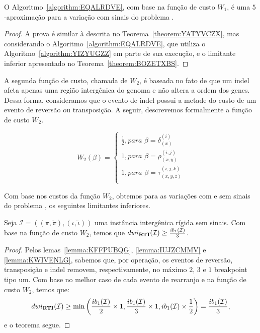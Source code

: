 \begin{theorem}\label{theorem:XMRIBCHD}
O Algoritmo~\ref{algorithm:EQALRDVE}, com base na função de custo $W_1$, é uma $5$-aproximação para a variação com sinais do problema \SbWIRI{}.
\end{theorem}
\begin{proof}
A prova é similar à descrita no Teorema~\ref{theorem:YATYVCZX}, mas considerando o Algoritmo~\ref{algorithm:EQALRDVE}, que utiliza o Algoritmo~\ref{algorithm:YIZYUGZZ} em parte de sua execução, e o limitante inferior apresentado no Teorema~\ref{theorem:BOZETXBS}.
\end{proof}

A segunda função de custo, chamada de $W_2$, é baseada no fato de que um indel afeta apenas uma região intergênica do genoma e não altera a ordem dos genes. Dessa forma, consideramos que o evento de indel possui a metade do custo de um evento de reversão ou transposição. A seguir, descrevemos formalmente a função de custo $W_2$.

$$
  W_2(\beta) = \begin{cases}
      \frac{1}{2}, \textit{para } \beta = \delta_{(x)}^{(i)} \\
      1, \textit{para } \beta = \rho_{(x,y)}^{(i,j)} \\
      1, \textit{para } \beta = \tau_{(x,y,z)}^{(i,j,k)} \\
  \end{cases}
$$

Com base nos custos da função $W_2$, obtemos para as variações com e sem sinais do problema \SbWIRTI{}, os seguintes limitantes inferiores.

\begin{theorem}\label{theorem:HFHHZDMV}
Seja $\mathcal{I} = ((\pi,\breve\pi),(\iota,\breve\iota))$ uma instância intergênica rígida sem sinais. Com base na função de custo $W_2$, temos que $dwi_{\textbf{RTI}}(\mathcal{I}) \ge \frac{ib_1(\mathcal{I})}{3}$.
\begin{proof}
Pelos lemas~\ref{lemma:KFFPUBQG}, \ref{lemma:IUJZCMMV} e \ref{lemma:KWIVENLG}, sabemos que, por operação, os eventos de reversão, transposição e indel removem, respectivamente, no máximo $2$, $3$ e $1$ breakpoint tipo um. Com base no melhor caso de cada evento de rearranjo e na função de custo $W_2$, temos que:
$$dwi_{\textbf{RTI}}(\mathcal{I}) \ge \min\left(\frac{ib_1(\mathcal{I})}{2} \times 1,\frac{ib_1(\mathcal{I})}{3} \times 1, ib_1(\mathcal{I}) \times \frac{1}{2}\right) = \frac{ib_1(\mathcal{I})}{3},$$ e o teorema segue.
\end{proof}
\end{theorem}

